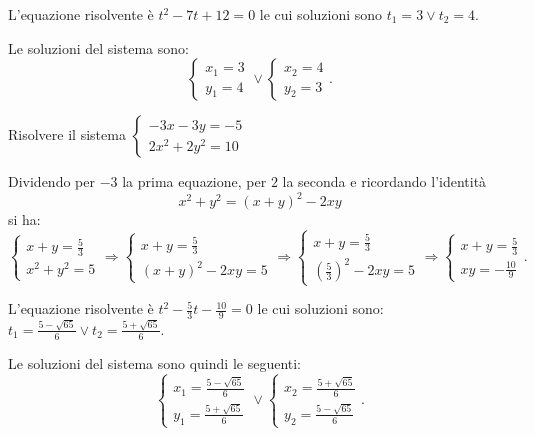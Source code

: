 \begin{exrig}
\begin{esempio}
L'equazione risolvente è $t^2-7t+12=0$ le cui soluzioni sono $t_1=3\vee t_2=4$.

Le soluzioni del sistema sono: 
\[\left\{\begin{array}{l}{x_1=3}\\
{y_1=4}\end{array}\right.\vee \left\{\begin{array}{l}{x_2=4}\\
{y_2=3}\end{array}\right..\]
\end{esempio}

\begin{esempio}
Risolvere il sistema $\left\{\begin{array}{l}{-3x-3y=-5}\\{2x^2+2y^2=10}\end{array}\right.$

Dividendo per $-3$ la prima equazione, per $2$ la seconda e ricordando l'identità 
\[x^2+y^2=(x+y)^2-2{xy}\] 
si ha: 
\[ \left\{\begin{array}{l}{x+y=\frac 5 3}\\
{x^2+y^2=5}\end{array}\right.
\Rightarrow \left\{\begin{array}{l}{x+y=\frac 5 3}\\
{(x+y)^2-2{xy}=5}\end{array}\right.
\Rightarrow \left\{\begin{array}{l}{x+y=\frac 5 3}\\
{\left(\frac 5 3\right)^2-2{xy}=5}\end{array}\right.
\Rightarrow \left\{\begin{array}{l}{x+y=\frac 5 3}\\
{{xy}=-\frac{10} 9}\end{array}\right..\]

L'equazione risolvente è $t^2-\frac 5 3t-\frac{10} 9=0$ le cui soluzioni sono: $t_1=\frac{5-\sqrt{65}} 6\vee t_2=\frac{5+\sqrt{65}} 6$.

Le soluzioni del sistema sono quindi le seguenti: 
\[\left\{\begin{array}{l}{x_1=\frac{5-\sqrt{65}} 6}\\{y_1=\frac{5+\sqrt{65}} 6}\end{array}\right.\vee \left\{\begin{array}{l}{x_2=\frac{5+\sqrt{65}} 6}\\{y_2=\frac{5-\sqrt{65}} 6}\end{array}\right..\]
\end{esempio}
\end{exrig}
\ovalbox{\risolvii \ref{ese:6.20}, \ref{ese:6.21}, \ref{ese:6.22}, \ref{ese:6.23}, \ref{ese:6.24}}

